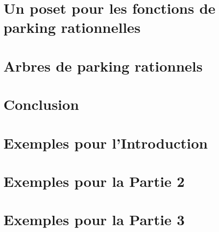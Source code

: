 \documentclass[11pt]{article}
\theoremstyle{remark}
\theoremstyle{definition}
\begin{document}
\section{Un poset pour les fonctions de parking rationnelles}


\newpage
\section{Arbres de parking rationnels}


\section{Conclusion}





\appendix

\newpage
\section{Exemples pour l'Introduction}


\section{Exemples pour la Partie 2}


\section{Exemples pour la Partie 3}

\end{document}
